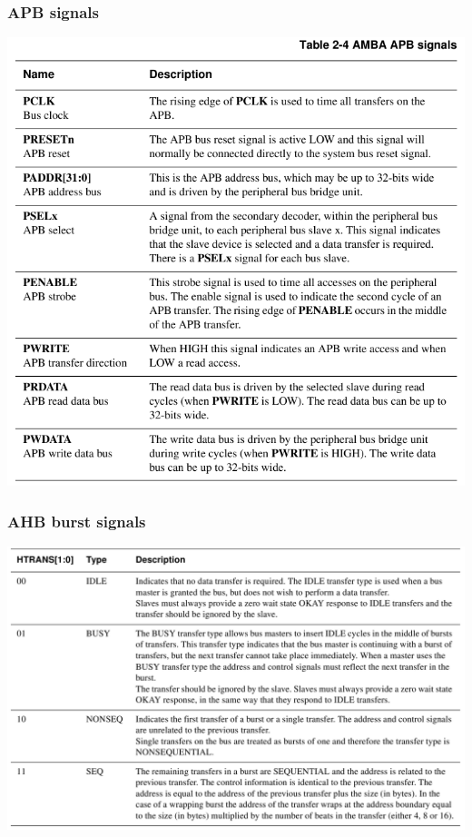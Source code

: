 \documentclass[a4paper]{scrartcl}
\begin{document}
        \subsubsection*{APB signals}
        \centering\includegraphics[scale=0.6]{amba4.png}
        \subsubsection*{AHB burst signals}
        \centering\includegraphics[scale=0.4]{amba6.png}
\end{document}
